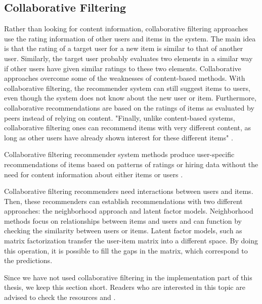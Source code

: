 
\subsection{Collaborative Filtering}\label{section:collaborative_filtering}

Rather than looking for content information, collaborative filtering approaches use the rating information of other users and items in the system. The main idea is that the rating of a target user for a new item is similar to that of another user. Similarly, the target user probably evaluates two elements in a similar way if other users have given similar ratings to these two elements. Collaborative approaches overcome some of the weaknesses of content-based methods. With collaborative filtering, the recommender system can still suggest items to users, even though the system does not know about the new user or item. Furthermore, collaborative recommendations are based on the ratings of items as evaluated by peers instead of relying on content. "Finally, unlike content-based systems, collaborative filtering ones can recommend items with very different content, as long as other users have already shown interest for these different items" \cite{desrosiers2011comprehensive}.

Collaborative filtering recommender system methods produce user-specific recommendations of items based on patterns of ratings or hiring data without the need for content information about either items or users \cite{desrosiers2011comprehensive}.

Collaborative filtering recommenders need interactions between users and items. Then, these recommenders can establish recommendations with two different approaches: the neighborhood approach and latent factor models. Neighborhood methods focus on relationships between items and users and can function by checking the similarity between users or items.  Latent factor models, such as matrix factorization transfer the user-item matrix into a different space. By doing this operation, it is possible to fill the gaps in the matrix, which correspond to the predictions.

Since we have not used collaborative filtering in the implementation part of this thesis, we keep this section short. Readers who are interested in this topic are advised to check the resources \cite{koren2015advances} and \cite{wang2015collaborative}.

